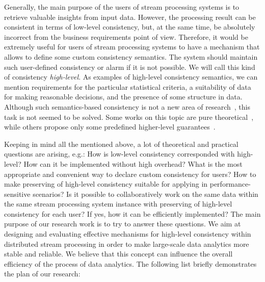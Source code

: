 Generally, the main purpose of the users of stream processing systems is to retrieve valuable insights from input data. However, the processing result can be consistent in terms of low-level consistency, but, at the same time, be absolutely incorrect from the business requirements point of view. Therefore, it would be extremely useful for users of stream processing systems to have a mechanism that allows to define some custom consistency semantics. The system should maintain such user-defined consistency or alarm if it is not possible. We will call this kind of consistency {\em high-level}. As examples of high-level consistency semantics, we can mention requirements for the particular statistical criteria, a suitability of data for making reasonable decisions, and the presence of some structure in data. Although such semantics-based consistency is not a new area of research~\cite{Garcia-Molina:1983:USK:319983.319985}, this task is not seemed to be solved. Some works on this topic are pure theoretical~\cite{Rodriguez:2008:ITA:1463434.1463480, Guo:2010:CMS:1822018.1822052}, while others propose only some predefined higher-level guarantees~\cite{Mihaila:2008:AIO:1458082.1458132, Fischer:2010:SSP:1739041.1739068}.

Keeping in mind all the mentioned above, a lot of theoretical and practical questions are arising, e.g.: How is low-level consistency corresponded with high-level? How can it be implemented without high overhead? What is the most appropriate and convenient way to declare custom consistency for users? How to make preserving of high-level consistency suitable for applying in performance-sensitive scenarios? Is it possible to collaboratively work on the same data within the same stream processing system instance with preserving of high-level consistency for each user? If yes, how it can be efficiently implemented? The main purpose of our research work is to try to answer these questions. We aim at designing and evaluating effective mechanisms for high-level consistency within distributed stream processing in order to make large-scale data analytics more stable and reliable. We believe that this concept can influence the overall efficiency of the process of data analytics. The following list briefly demonstrates the plan of our research:

